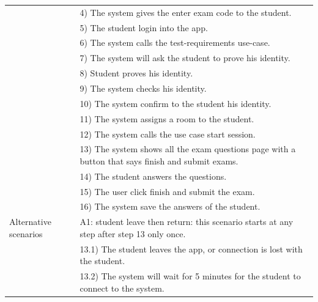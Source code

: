 \documentclass[]{uc2pfecaneva}
\begin{document}
\begin{table}[h]
\begin{tabularx}{\textwidth}{|l|X|}
            & 4) The system gives the enter exam code to the student.                                           \\
            & 5) The student login into the app.                                                                \\
            & 6) The system calls the test-requirements use-case.                                               \\
            & 7) The system will ask the student to prove his identity.                                         \\
            & 8) Student proves his identity.                                                                   \\
            & 9) The system checks his identity.                                                                \\
            & 10) The system confirm to the student his identity.                                               \\
            & 11) The system assigns a room to the student.                                                     \\
            & 12) The system calls the use case start session.                                                  \\
            & 13) The system shows all the exam questions page with a button that says finish and submit exams. \\
            & 14) The student answers the questions.                                                            \\
            & 15) The user click finish and submit the exam.                                                    \\
            & 16) The system save the answers of the student.                                                   \\ \hline
            Alternative scenarios
            & A1: student leave then return: this scenario starts at any step after step 13 only once.          \\
            & \hspace{4mm}13.1) The student leaves the app, or connection is lost with the student.             \\
            & \hspace{4mm}13.2) The system will wait for 5 minutes for the student to connect to the system.    \\

\end{tabularx}
\end{table}
\end{document}
